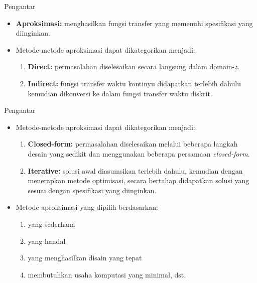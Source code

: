 \documentclass[pdflatex,compress,mathserif]{beamer}
\begin{document}
\begin{frame}{Pengantar}
	\begin{itemize}
		\item \textbf{Aproksimasi:}  menghasilkan fungsi transfer yang memenuhi spesifikasi yang diinginkan.
		\item Metode-metode aproksimasi dapat dikategorikan menjadi:
		\begin{enumerate}
			\item \textbf{Direct:} permasalahan diselesaikan secara langsung dalam domain-$ z $.
			\item \textbf{Indirect:} fungsi transfer waktu kontinyu didapatkan terlebih dahulu kemudian dikonversi ke dalam fungsi transfer waktu diskrit.
		\end{enumerate}
	\end{itemize}
\end{frame}

\begin{frame}{Pengantar}
	\begin{itemize}
		
		\item Metode-metode aproksimasi dapat dikategorikan menjadi:
		\begin{enumerate}
			\item \textbf{Closed-form:} permasalahan diselesaikan melalui beberapa langkah desain yang sedikit dan menggunakan beberapa persamaan \textit{closed-form}.
			\item \textbf{Iterative:} solusi awal diasumsikan terlebih dahulu, kemudian dengan menerapkan metode optimisasi, secara bertahap didapatkan solusi yang sesuai dengan spesifikasi yang diinginkan.
		\end{enumerate}
		\item Metode aproksimasi yang dipilih berdasarkan:
		\begin{enumerate}
			\item yang sederhana
			\item yang handal
			\item yang menghasilkan disain yang tepat
			\item membutuhkan usaha komputasi yang minimal, dst.
		\end{enumerate}
	\end{itemize}
\end{frame}
\end{document}
